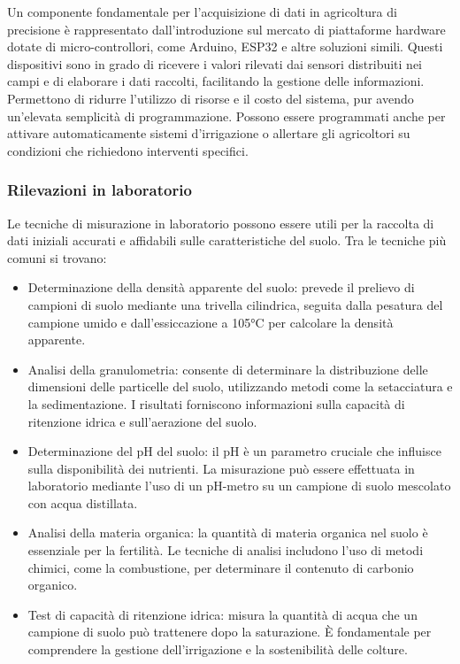\documentclass[12pt,a4paper,openright,twoside]{book}
\begin{document}
Un componente fondamentale per l'acquisizione di dati in agricoltura di precisione è rappresentato dall'introduzione sul mercato di piattaforme hardware dotate di micro-controllori, come Arduino, ESP32 e altre soluzioni simili. Questi dispositivi sono in grado di ricevere i valori rilevati dai sensori distribuiti nei campi e di elaborare i dati raccolti, facilitando la gestione delle informazioni. Permettono di ridurre l'utilizzo di risorse e il costo del sistema, pur avendo un'elevata semplicità di programmazione. Possono essere programmati anche per attivare automaticamente sistemi d'irrigazione o allertare gli agricoltori su condizioni che richiedono interventi specifici\cite{iot4030012, su16010306}.

\subsubsection{Rilevazioni in laboratorio}

Le tecniche di misurazione in laboratorio possono essere utili per la raccolta di dati iniziali accurati e affidabili sulle caratteristiche del suolo. Tra le tecniche più comuni si trovano:
\begin{itemize}[noitemsep]
    \item Determinazione della densità apparente del suolo: prevede il prelievo di campioni di suolo mediante una trivella cilindrica, seguita dalla pesatura del campione umido e dall'essiccazione a 105°C per calcolare la densità apparente\cite{BULK-DENSITY}.
    \item Analisi della granulometria: consente di determinare la distribuzione delle dimensioni delle particelle del suolo, utilizzando metodi come la setacciatura e la sedimentazione. I risultati forniscono informazioni sulla capacità di ritenzione idrica e sull'aerazione del suolo\cite{GRANUMETRIC-ANALYSIS}.
    \item Determinazione del pH del suolo: il pH è un parametro cruciale che influisce sulla disponibilità dei nutrienti. La misurazione può essere effettuata in laboratorio mediante l'uso di un pH-metro su un campione di suolo mescolato con acqua distillata\cite{PH-SOIL}.
    \item Analisi della materia organica: la quantità di materia organica nel suolo è essenziale per la fertilità. Le tecniche di analisi includono l'uso di metodi chimici, come la combustione, per determinare il contenuto di carbonio organico\cite{ORGANIC-SOIL}.
    \item Test di capacità di ritenzione idrica: misura la quantità di acqua che un campione di suolo può trattenere dopo la saturazione. È fondamentale per comprendere la gestione dell'irrigazione e la sostenibilità delle colture\cite{WATER-RETENTION-LAB}.
\end{itemize}
\end{document}
